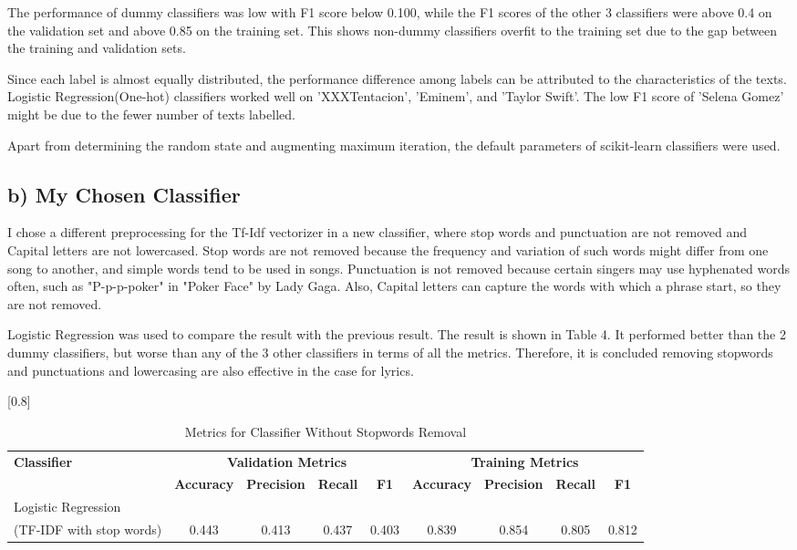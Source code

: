 \documentclass[a4paper,11pt]{article}
\begin{document}
The performance of dummy classifiers was low with F1 score below 0.100,
while the F1 scores of the other 3 classifiers were above 0.4 on the validation set
and above 0.85 on the training set.
This shows non-dummy classifiers overfit to the training set due to the gap between the training and validation sets.

Since each label is almost equally distributed, the performance difference among labels can be attributed to the characteristics of the texts.
Logistic Regression(One-hot) classifiers worked well on 'XXXTentacion', 'Eminem', and 'Taylor Swift'.
The low F1 score of 'Selena Gomez' might be due to the fewer number of texts labelled.

Apart from determining the random state and augmenting maximum iteration, the default parameters of scikit-learn classifiers were used.


\subsection{b) My Chosen Classifier}
I chose a different preprocessing for the Tf-Idf vectorizer in a new classifier, where stop words and punctuation are not removed and Capital letters are not lowercased.
Stop words are not removed because the frequency and variation of such words might differ from one song to another, and simple words tend to be used in songs.
Punctuation is not removed because certain singers may use hyphenated words often, such as "P-p-p-poker" in "Poker Face" by Lady Gaga. 
Also, Capital letters can capture the words with which a phrase start, so they are not removed.

Logistic Regression was used to compare the result with the previous result.
The result is shown in Table 4.
It performed better than the 2 dummy classifiers, but worse than any of the 3 other classifiers in terms of all the metrics.
Therefore, it is concluded removing stopwords and punctuations and lowercasing are also effective in the case for lyrics.




\begin{table}[htbp]
    \centering
    \caption{Metrics for Classifier Without Stopwords Removal}
    \scalebox{0.8}[0.8]{
    \begin{tabular}{l|cccc|cccc}
        \hline
        \textbf{Classifier} & \multicolumn{4}{c|}{\textbf{Validation Metrics}} & \multicolumn{4}{c}{\textbf{Training Metrics}} \\
        & \textbf{Accuracy} & \textbf{Precision} & \textbf{Recall} & \textbf{F1} & \textbf{Accuracy} & \textbf{Precision} & \textbf{Recall} & \textbf{F1} \\
        \hline 
        Logistic Regression &&&&&& \\ (TF-IDF with stop words) & 0.443 & 0.413 & 0.437 & 0.403 & 0.839 & 0.854 & 0.805 & 0.812 \\
        \hline
    \end{tabular}
    }
\end{table}
\end{document}
